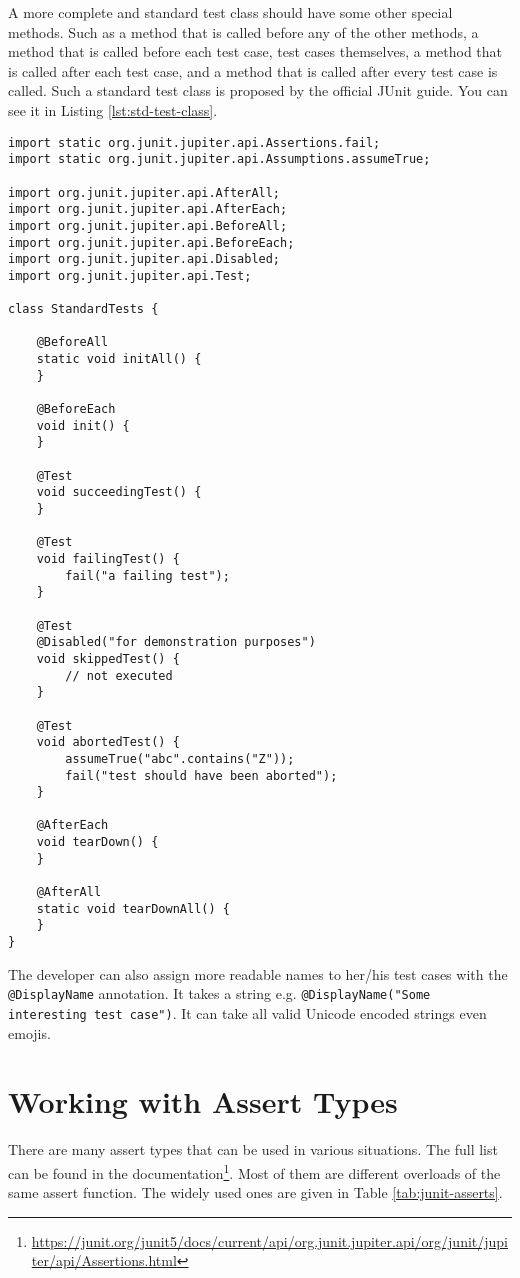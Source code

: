 A more complete and standard test class should have some other special methods. Such as a method that is called before any of the other methods, a method that is called before each test case, test cases themselves, a method that is called after each test case, and a method that is called after every test case is called. Such a standard test class is proposed by the official JUnit guide. You can see it in Listing \ref{lst:std-test-class}.

\begin{lstlisting}[caption={A standard test class.},label=lst:std-test-class]
import static org.junit.jupiter.api.Assertions.fail;
import static org.junit.jupiter.api.Assumptions.assumeTrue;

import org.junit.jupiter.api.AfterAll;
import org.junit.jupiter.api.AfterEach;
import org.junit.jupiter.api.BeforeAll;
import org.junit.jupiter.api.BeforeEach;
import org.junit.jupiter.api.Disabled;
import org.junit.jupiter.api.Test;

class StandardTests {

    @BeforeAll
    static void initAll() {
    }
    
    @BeforeEach
    void init() {
    }
    
    @Test
    void succeedingTest() {
    }
    
    @Test
    void failingTest() {
        fail("a failing test");
    }
    
    @Test
    @Disabled("for demonstration purposes")
    void skippedTest() {
        // not executed
    }
    
    @Test
    void abortedTest() {
        assumeTrue("abc".contains("Z"));
        fail("test should have been aborted");
    }
    
    @AfterEach
    void tearDown() {
    }
    
    @AfterAll
    static void tearDownAll() {
    }
}
\end{lstlisting}

The developer can also assign more readable names to her/his test cases with the \lstinline!@DisplayName! annotation. It takes a string e.g. \lstinline!@DisplayName("Some interesting test case")!. It can take all valid Unicode encoded strings even emojis.

\section{Working with Assert Types}
There are many assert types that can be used in various situations. The full list can be found in the documentation\footnote{\url{https://junit.org/junit5/docs/current/api/org.junit.jupiter.api/org/junit/jupiter/api/Assertions.html}}. Most of them are different overloads of the same assert function. The widely used ones are given in Table \ref{tab:junit-asserts}.

